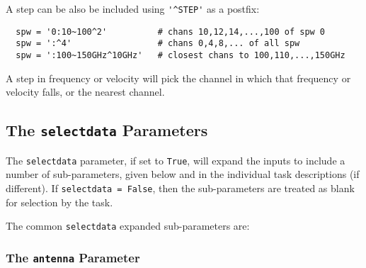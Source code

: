 
A step can be also be included using {\verb!'^STEP'!} as a postfix:
\small
\begin{verbatim}
  spw = '0:10~100^2'          # chans 10,12,14,...,100 of spw 0
  spw = ':^4'                 # chans 0,4,8,... of all spw
  spw = ':100~150GHz^10GHz'   # closest chans to 100,110,...,150GHz
\end{verbatim}
\normalsize
A step in frequency or velocity will pick the channel in which that
frequency or velocity falls, or the nearest channel.

\subsection{The {\tt selectdata} Parameters}
\label{section:io.selection.selectdata}

The {\tt selectdata} parameter, if set to {\tt True}, will expand
the inputs to include a number of sub-parameters, given below and
in the individual task descriptions (if different).  If 
{\tt selectdata = False}, then the sub-parameters are treated as
blank for selection by the task.  

The common {\tt selectdata} expanded sub-parameters are:

\subsubsection{The {\tt antenna} Parameter}
\label{section:io.selection.selectdata.antenna}

